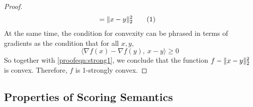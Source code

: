 \documentclass[letterpaper]{article} %
\theoremstyle{plain}
\theoremstyle{definition}
\theoremstyle{remark}
\newcommand\numberthis{\addtocounter{equation}{1}\tag{\theequation}}
\DeclarePairedDelimiter{\norm}{\lVert}{\rVert}
\begin{document}
{\begin{proof}
\begin{align*}
			&= \norm{x-y}^2_2 \numberthis\label{proofeqn:strong1}
	\end{align*}
	At the same time, the condition for convexity can be phrased in terms of gradients as the condition that for all $x,y$,
	\[  \Big\langle \nabla f(x) - \nabla f(y),~ x-y\Big\rangle \geq 0\]
	So together with \eqref{proofeqn:strong1}, we conclude that the function $f - \norm{x-y}^2_2$ is convex. Therefore, $f$ is 1-strongly convex.
\end{proof}

	}
	
\subsection{Properties of Scoring Semantics}
\end{document}
